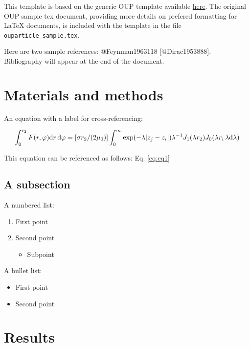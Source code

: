 \documentclass[12pt,halfline,a4paper,]{ouparticle}
\providecommand{\tightlist}{%
  \setlength{\itemsep}{0pt}\setlength{\parskip}{0pt}}
\begin{document}
This template is based on the generic OUP template available \href{https://academic.oup.com/icesjms/pages/General_Instructions}{here}. The original OUP sample tex document, providing more details on prefered formatting for LaTeX documents, is included with the template in the file \texttt{ouparticle\_sample.tex}.

Here are two sample references: @Feynman1963118 {[}@Dirac1953888{]}. Bibliography will appear at the end of the document.

\hypertarget{materials-and-methods}{%
\section{Materials and methods}\label{materials-and-methods}}

An equation with a label for cross-referencing:

\begin{equation}\label{eq:eq1}
\int^{r_2}_0 F(r,\varphi){\rm d}r\,{\rm d}\varphi = [\sigma r_2/(2\mu_0)]
\int^{\infty}_0\exp(-\lambda|z_j-z_i|)\lambda^{-1}J_1 (\lambda r_2)J_0
(\lambda r_i\,\lambda {\rm d}\lambda)
\end{equation}

This equation can be referenced as follows: Eq. \ref{eq:eq1}

\hypertarget{a-subsection}{%
\subsection{A subsection}\label{a-subsection}}

A numbered list:

\begin{enumerate}
\def\labelenumi{\arabic{enumi})}
\tightlist
\item
  First point
\item
  Second point

  \begin{itemize}
  \tightlist
  \item
    Subpoint
  \end{itemize}
\end{enumerate}

A bullet list:

\begin{itemize}
\tightlist
\item
  First point
\item
  Second point
\end{itemize}

\hypertarget{results-1}{%
\section{Results}\label{results-1}}
\end{document}
